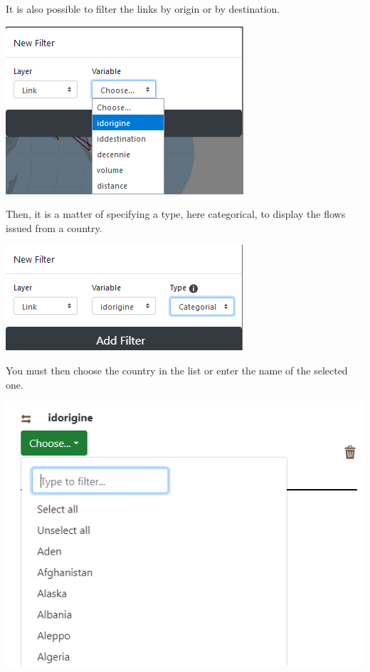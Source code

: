 \documentclass[
  letterpaper,
  DIV=11,
  numbers=noendperiod]{scrreprt}
\begin{document}
It is also possible to filter the links by origin or by destination.

\includegraphics{images/Add_links_filter_origin.png}

Then, it is a matter of specifying a type, here categorical, to display
the flows issued from a country.

\includegraphics{images/Add_filter_links_origin_categorial.png}

You must then choose the country in the list or enter the name of the
selected one.

\begin{center}
\includegraphics{images/Add_filter_node_category_select.png}
\end{center}
\end{document}
